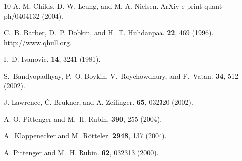 \documentclass[aps,twocolumn,showpacs,nofootinbib,groupedaddress]{revtex4}
\begin{document}
\begin{thebibliography}{10}
A. M. Childs, D. W. Leung, and M. A. Nielsen.
\newblock ArXiv e-print quant-ph/0404132 (2004).

C.~B. Barber, D.~P. Dobkin, and H.~T. Huhdanpaa.
 \textbf{22}, 469 (1996).
\newblock http://www.qhull.org.

I.~D. Ivanovic.
 \textbf{14}, 3241 (1981).

S.~Bandyopadhyay, P.~O. Boykin, V.~Roychowdhury, and F.~Vatan.
 \textbf{34}, 512 (2002).

J. Lawrence, \v{C}. Brukner, and A. Zeilinger.
 \textbf{65}, 032320 (2002).

A. O. Pittenger and M.~H. Rubin.
 \textbf{390}, 255 (2004).

A.~Klappenecker and M.~R\"{o}tteler.
 \textbf{2948}, 137 (2004).

A. Pittenger and M.~H. Rubin.
 \textbf{62}, 032313 (2000).

\end{thebibliography}
\end{document}
